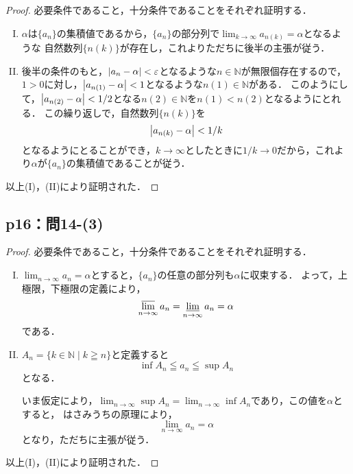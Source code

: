 \documentclass[uplatex,dvipdfmx,a4paper,10pt,fleqn]{jsarticle}
\newenvironment{tleftbar}{\begin{tbleftline}\setlength{\parindent}{1zw}}{\end{tbleftline}}
\begin{document}
\begin{tleftbar}
    \begin{proof}
    必要条件であること，十分条件であることをそれぞれ証明する．
    \begin{enumerate}[(I)]
        \item $\alpha$は$\{ a_n \}$の集積値であるから，$\{ a_n \}$の部分列で$\lim_{k\to \infty} a_{n(k)} = \alpha$となるような
        自然数列$\{ n (k) \}$が存在し，これよりただちに後半の主張が従う．
        \item 後半の条件のもと，$\abs{a_n - \alpha}< \varepsilon$となるような$n \in \mathbb{N}$が無限個存在するので，
        $1>0$に対し，$\abs{a_{n(1)}-\alpha}<1$となるような$n(1) \in \mathbb{N}$がある．
        このようにして，$\abs{a_{n(2)}-\alpha}< 1/2$となる$n(2) \in \mathbb{N}$を$n (1)<n(2)$となるようにとれる．
        この繰り返しで，自然数列$\{ n(k) \}$を
        \[
            \abs{a_{n(k)}-\alpha}< 1/k
        \]
        となるようにとることができ，$k \to \infty$としたときに$1/k \to 0$だから，これより$\alpha$が$\{ a_n \}$の集積値であることが従う．
    \end{enumerate}
    以上(I)，(II)により証明された．
    \end{proof}
\end{tleftbar}


\subsection*{p16：問14-(3)}

\begin{tleftbar}
    \begin{proof}
    必要条件であること，十分条件であることをそれぞれ証明する．
    \begin{enumerate}[(I)]
        \item $\lim_{n \to \infty} a_n = \alpha$とすると，$\{ a_n \}$の任意の部分列も$\alpha$に収束する．
        よって，上極限，下極限の定義により，
        \[
            \varlimsup_{n \to \infty} a_n = \varliminf_{n \to \infty} a_n = \alpha
        \]
        である．
        \item $ A_n =\{ k \in \mathbb{N} \mid k \geqq n \}$と定義すると
        \[
            \inf A_n \leqq a_n \leqq \sup A_n
        \]
        となる．

        いま仮定により，$\lim_{n \to \infty} \sup A_n = \lim_{n \to \infty} \inf A_n$であり，この値を$\alpha$とすると，
        はさみうちの原理により，
        \[
            \lim_{n \to \infty} a_n = \alpha
        \]
        となり，ただちに主張が従う．
    \end{enumerate}
    以上(I)，(II)により証明された．
\end{proof}
\end{tleftbar}
\end{document}

